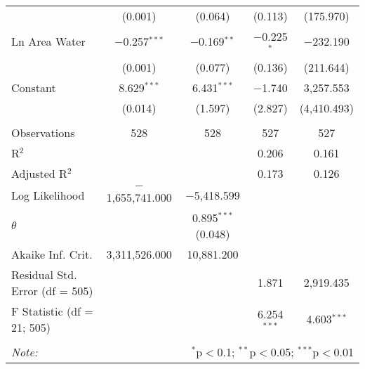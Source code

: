 \begin{table}[!htbp]
\begin{tabular}{@{\extracolsep{5pt}}lcccc}
  & (0.001) & (0.064) & (0.113) & (175.970) \\ 
  Ln Area Water & $-$0.257$^{***}$ & $-$0.169$^{**}$ & $-$0.225$^{*}$ & $-$232.190 \\ 
  & (0.001) & (0.077) & (0.136) & (211.644) \\ 
  Constant & 8.629$^{***}$ & 6.431$^{***}$ & $-$1.740 & 3,257.553 \\ 
  & (0.014) & (1.597) & (2.827) & (4,410.493) \\ 
 \hline \\[-1.8ex] 
Observations & 528 & 528 & 527 & 527 \\ 
R$^{2}$ &  &  & 0.206 & 0.161 \\ 
Adjusted R$^{2}$ &  &  & 0.173 & 0.126 \\ 
Log Likelihood & $-$1,655,741.000 & $-$5,418.599 &  &  \\ 
$\theta$ &  & 0.895$^{***}$  (0.048) &  &  \\ 
Akaike Inf. Crit. & 3,311,526.000 & 10,881.200 &  &  \\ 
Residual Std. Error (df = 505) &  &  & 1.871 & 2,919.435 \\ 
F Statistic (df = 21; 505) &  &  & 6.254$^{***}$ & 4.603$^{***}$ \\ 
\hline 
\hline \\[-1.8ex] 
\textit{Note:}  & \multicolumn{4}{r}{$^{*}$p$<$0.1; $^{**}$p$<$0.05; $^{***}$p$<$0.01} \\ 
\end{tabular} 
\end{table} 
